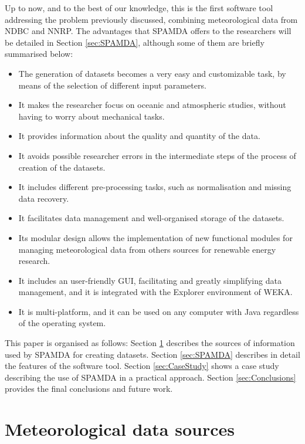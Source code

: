 \documentclass[energies,article,submit,moreauthors,pdftex]{Definitions/mdpi}
\begin{document}
		Up to now, and to the best of our knowledge, this is the first software tool addressing the problem previously discussed, combining meteorological data from NDBC and NNRP. The advantages that SPAMDA offers to the researchers will be detailed in Section \ref{sec:SPAMDA}, although some of them are briefly summarised below:
		\begin{itemize}[leftmargin=*,labelsep=5.8mm]
			\item The generation of datasets becomes a very easy and customizable task, by means of the selection of different input parameters.
			\item It makes the researcher focus on oceanic and atmospheric studies, without having to worry about mechanical tasks.
			\item It provides information about the quality and quantity of the data.
			\item It avoids possible researcher errors in the intermediate steps of the process of creation of the datasets.
			\item It includes different pre-processing tasks, such as normalisation and missing data recovery.
			\item It facilitates data management and well-organised storage of the datasets.
			\item Its modular design allows the implementation of new functional modules for managing meteorological data from others sources for renewable energy research.
			\item It includes an user-friendly GUI, facilitating and greatly simplifying data management, and it is integrated with the Explorer environment of WEKA.
			\item It is multi-platform, and it can be used on any computer with Java regardless of the operating system.
		\end{itemize}
			
		This paper is organised as follows: Section \ref{sec:DataSources} describes the sources of information used by SPAMDA for creating datasets. Section \ref{sec:SPAMDA} describes in detail the features of the software tool. Section \ref{sec:CaseStudy} shows a case study describing the use of SPAMDA in a practical approach. Section \ref{sec:Conclusions} provides the final conclusions and future work.
		
	\section{Meteorological data sources}\label{sec:DataSources}
		
\end{document}
